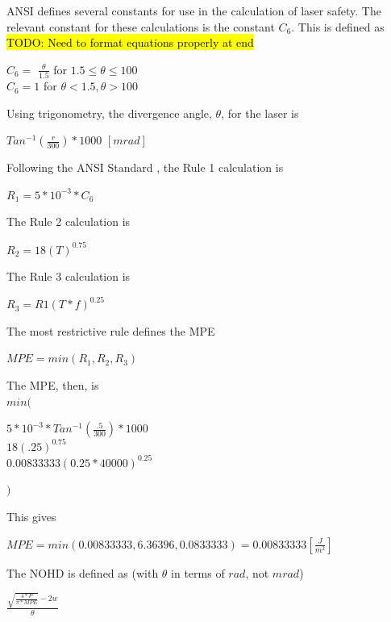 \documentclass[letterpaper,10pt]{article}
\begin{document}
\begin{spacing}{1.15}
 ANSI defines several constants for use in the calculation of laser safety. The relevant constant for these calculations is the constant $C_6$. This is defined as \hl{TODO: Need to format equations properly at end}
 \begin{center}
 	\large
 	$C_6 =$
 	$\frac{\theta}{1.5}$ for $1.5 \leq \theta \leq 100$\\
 	$C_6 = 1$ for $\theta < 1.5, \theta > 100$
 \end{center}
 
 Using trigonometry, the divergence angle, $\theta$, for the laser is 
 \begin{center}
 	\large
 	$Tan^{-1}(\frac{r}{300})* 1000$ $[mrad]$
 \end{center}
 
 Following the ANSI Standard \cite{ANSI}, the Rule 1 calculation is 
 \begin{center}
 	\large
 	$R_1 = 5*10^{-3} * C_6$
 \end{center}
 
 The Rule 2 calculation is
 \begin{center}
 	\large
 	$R_2 = 18 (T)^{0.75}$
 \end{center}
 
 The Rule 3 calculation is
 \begin{center}
 	\large
 	$R_3 = R1(T*f)^{0.25}$
 \end{center}
 
 The most restrictive rule defines the MPE 
 \begin{center}
 	\large
 	$MPE = min(R_1, R_2, R_3)$
 \end{center}
 
 The MPE, then, is\\
 {\large $min($}
 \begin{center}
 	\large
 	$ 5*10^{-3} * Tan^{-1}(\frac{.5}{300})* 1000$\\
 	$18 (.25)^{0.75}$ \\
 	$0.00833333 (0.25*40000)^{0.25}$
 \end{center}
 {\large $)$}
 
 This gives 
 \begin{center}
 	\large
 	$MPE = min(0.00833333, 6.36396, 0.0833333) = 0.00833333 [\frac{J}{m^2}]$
 \end{center}
 
 The NOHD is defined as (with $\theta$ in terms of $rad$, not $mrad$)
 \begin{center}
 	\large
 	$ \frac{\sqrt{\frac{4 * P}{\pi * MPE}} - 2w}{\theta}$
 \end{center}
 

\end{spacing}
\end{document}
